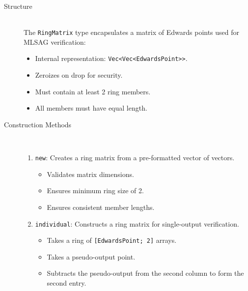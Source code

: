 \documentclass[12pt,a4paper]{article}
\begin{document}
\begin{description}
\item[Structure] \hfill \\
The \texttt{RingMatrix} type encapsulates a matrix of Edwards points used for MLSAG verification:
\begin{itemize}
  \item Internal representation: \texttt{Vec<Vec<EdwardsPoint>>}.
  \item Zeroizes on drop for security.
  \item Must contain at least 2 ring members.
  \item All members must have equal length.
\end{itemize}

\item[Construction Methods] \hfill \\
\begin{enumerate}
  \item \texttt{new}: Creates a ring matrix from a pre-formatted vector of vectors.
    \begin{itemize}
      \item Validates matrix dimensions.
      \item Ensures minimum ring size of 2.
      \item Ensures consistent member lengths.
    \end{itemize}

  \item \texttt{individual}: Constructs a ring matrix for single-output verification.
    \begin{itemize}
      \item Takes a ring of \texttt{[EdwardsPoint; 2]} arrays.
      \item Takes a pseudo-output point.
      \item Subtracts the pseudo-output from the second column to form the second entry.
    \end{itemize}
\end{enumerate}


\end{description}
\end{document}

